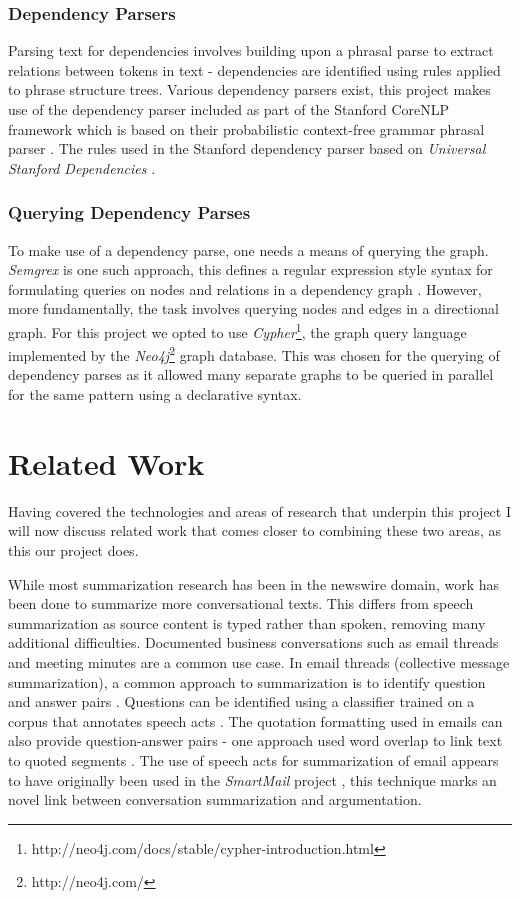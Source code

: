       \subsubsection{Dependency Parsers}
        Parsing text for dependencies involves building upon a phrasal parse to extract relations between tokens in text - dependencies are identified using rules applied to phrase structure trees. Various dependency parsers exist, this project makes use of the dependency parser included as part of the Stanford CoreNLP framework \cite{de2006generating} which is based on their probabilistic context-free grammar phrasal parser \cite{klein2003accurate}. The rules used in the Stanford dependency parser based on \textit{Universal Stanford Dependencies} \cite{de2014universal}.
      \subsubsection{Querying Dependency Parses}
        To make use of a dependency parse, one needs a means of querying the graph. \textit{Semgrex} is one such approach, this defines a regular expression style syntax for formulating queries on nodes and relations in a dependency graph \cite{Chambers2007}. However, more fundamentally, the task involves querying nodes and edges in a directional graph. For this project we opted to use \textit{Cypher}\footnote{http://neo4j.com/docs/stable/cypher-introduction.html}, the graph query language implemented by the \textit{Neo4j}\footnote{http://neo4j.com/} graph database. This was chosen for the querying of dependency parses as it allowed many separate graphs to be queried in parallel for the same pattern using a declarative syntax.

  \section{Related Work}
    Having covered the technologies and areas of research that underpin this project I will now discuss related work that comes closer to combining these two areas, as this our project does.

    While most summarization research has been in the newswire domain, work has been done to summarize more conversational texts. This differs from speech summarization as source content is typed rather than spoken, removing many additional difficulties. Documented business conversations such as email threads and meeting minutes are a common use case. In email threads (collective message summarization), a common approach to summarization is to identify question and answer pairs \cite{shrestha2007using,shrestha2004detection,carenini2007summarizing}. Questions can be identified using a classifier trained on a corpus that annotates speech acts \cite{shrestha2004detection}. The quotation formatting used in emails can also provide question-answer pairs - one approach used word overlap to link text to quoted segments \cite{carenini2007summarizing}. The use of speech acts for summarization of email appears to have originally been used in the \textit{SmartMail} project \cite{corston2004task}, this technique marks an novel link between conversation summarization and argumentation.

